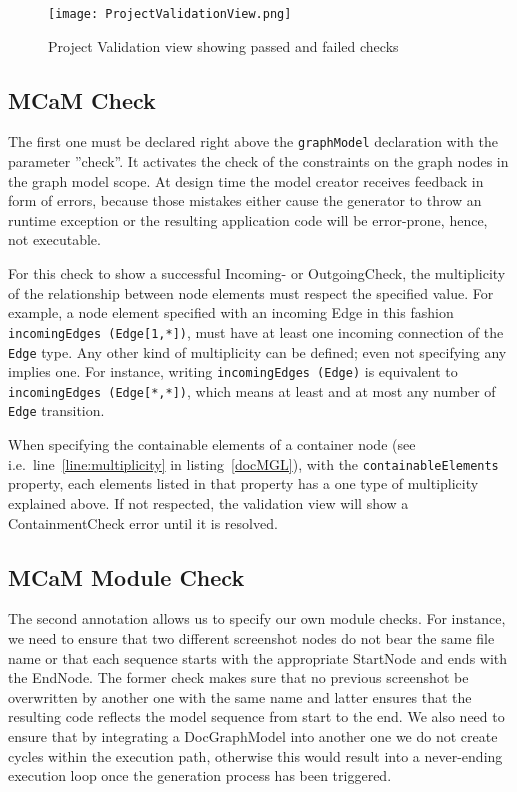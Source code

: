 \begin{figure}[h]
    \centering
    \texttt{[image: ProjectValidationView.png]}
    \caption{Project Validation view showing passed and failed checks}
    \label{fig:modelChecks}
\end{figure}

\subsection{MCaM Check}\label{sec:mcamCheck}

The first one must be declared right above the \lstinline[language=MGL]{graphModel} declaration with the parameter ''check''. It activates the check of the constraints on the graph nodes in the graph model scope. At design time the model creator receives feedback in form of errors, because those mistakes either cause the generator to throw an runtime exception or the resulting application code will be error-prone, hence, not executable. 

For this check to show a successful Incoming- or OutgoingCheck, the multiplicity of the relationship between node elements must respect the specified value. For example, a node element specified with an incoming Edge in this fashion \lstinline[language=MGL]{incomingEdges (Edge[1,*])}, must have at least one incoming connection of the \lstinline[language=MGL]{Edge} type. Any other kind of multiplicity can be defined; even not specifying any implies one. For instance, writing \lstinline[language=MGL]{incomingEdges (Edge)} is equivalent to \lstinline[language=MGL]{incomingEdges (Edge[*,*])}, which means at least and at most any number of \lstinline[language=MGL]{Edge} transition.

When specifying the containable elements of a container node (see i.e.~line~\ref{line:multiplicity} in listing~\ref{docMGL}), with the \lstinline[language=MGL]{containableElements} property, each elements listed in that property has a one type of multiplicity explained above. If not respected, the validation view will show a ContainmentCheck error until it is resolved.

\subsection{MCaM Module Check}\label{sec:mcamModCheck}

The second annotation allows us to specify our own module checks. For instance, we need to ensure that two different screenshot nodes do not bear the same file name or that each sequence starts with the appropriate StartNode and ends with the EndNode. The former check makes sure that no previous screenshot be overwritten by another one with the same name and latter ensures that the resulting code reflects the model sequence from start to the end. We also need to ensure that by integrating a DocGraphModel into another one we do not create cycles within the execution path, otherwise this would result into a never-ending execution loop once the generation process has been triggered.

